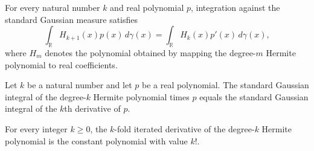\begin{lemma}
\label{BooleanAnalysis.GaussianSpace.integral_hermite_succ_mul_polynomial_standardGaussian}
\leanok
{}
For every natural number $k$ and real polynomial $p$, integration against the standard
Gaussian measure satisfies
\[
\int_{\mathbb R} H_{k+1}(x)p(x)\,d\gamma(x)=\int_{\mathbb R}H_k(x)p'(x)\,d\gamma(x),
\]
where $H_m$ denotes the polynomial obtained by mapping the degree-$m$ Hermite polynomial
to real coefficients.
\end{lemma}

\begin{lemma}
\label{BooleanAnalysis.GaussianSpace.integral_hermite_mul_polynomial_standardGaussian}
\leanok
{}
Let $k$ be a natural number and let $p$ be a real polynomial. The standard Gaussian
integral of the degree-$k$ Hermite polynomial times $p$ equals the standard Gaussian
integral of the $k$th derivative of $p$.
\end{lemma}

\begin{lemma}
\label{BooleanAnalysis.GaussianSpace.iterate_derivative_hermite_self}
\leanok
{}
For every integer $k\ge 0$, the $k$-fold iterated derivative of the degree-$k$ Hermite
polynomial is the constant polynomial with value $k!$.
\end{lemma}

